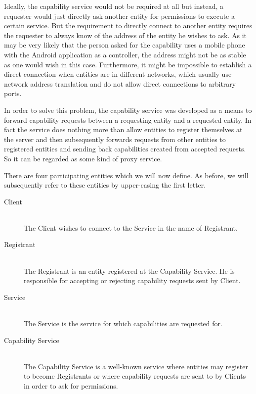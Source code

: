 Ideally, the capability service would not be required at all but instead, a requester would just directly ask another entity for permissions to execute a certain service.
But the requirement to directly connect to another entity requires the requester to always know of the address of the entity he wishes to ask.
As it may be very likely that the person asked for the capability uses a mobile phone with the Android application as a controller, the address might not be as stable as one would wish in this case.
Furthermore, it might be impossible to establish a direct connection when entities are in different networks, which usually use network address translation and do not allow direct connections to arbitrary ports.

In order to solve this problem, the capability service was developed as a means to forward capability requests between a requesting entity and a requested entity.
In fact the service does nothing more than allow entities to register themselves at the server and then subsequently forwards requests from other entities to registered entities and sending back capabilities created from accepted requests.
So it can be regarded as some kind of proxy service.

There are four participating entities which we will now define.
As before, we will subsequently refer to these entities by upper-casing the first letter.
\begin{description}
    \item[Client]\hfill\\
        The Client wishes to connect to the Service in the name of Registrant.
    \item[Registrant]\hfill\\
        The Registrant is an entity registered at the Capability Service.
        He is responsible for accepting or rejecting capability requests sent by Client.
    \item[Service]\hfill\\
        The Service is the service for which capabilities are requested for.
    \item[Capability Service]\hfill\\
        The Capability Service is a well-known service where entities may register to become Registrants or where capability requests are sent to by Clients in order to ask for permissions.
\end{description}

